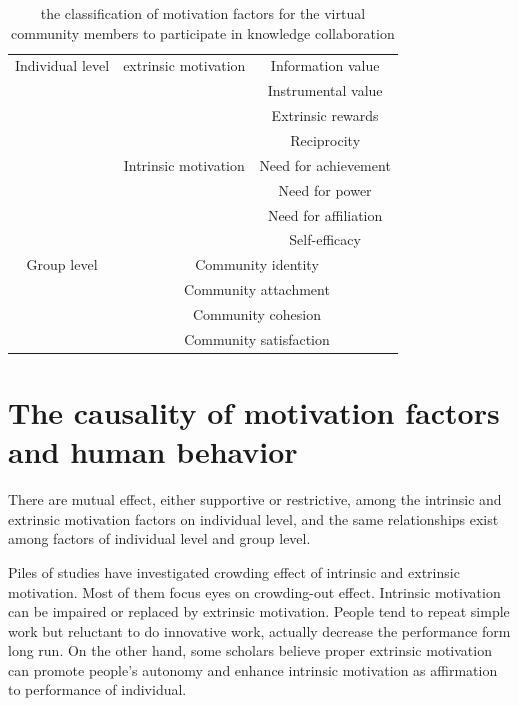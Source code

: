 \documentclass[doublespacing]{elsarticle}
\begin{document}
\begin{table}[htpb]

  \centering
   \caption{the classification of motivation factors for the virtual
    community members to participate in knowledge collaboration}
\begin{tabular}{ccc}
    \toprule
    \multicolumn{ 1}{c|}{Individual level} & \multicolumn{ 1}{|c|}{extrinsic motivation} & Information value \\
    \multicolumn{ 1}{c|}{} & \multicolumn{ 1}{|c|}{} & Instrumental value \\
    \multicolumn{ 1}{c|}{} & \multicolumn{ 1}{|c|}{} & Extrinsic rewards \\
    \multicolumn{ 1}{c|}{} & \multicolumn{ 1}{|c|}{} & Reciprocity \\\cline{2-3}
    \multicolumn{ 1}{c|}{} & \multicolumn{ 1}{|c|}{Intrinsic motivation} & Need for achievement \\
    \multicolumn{ 1}{c|}{} & \multicolumn{ 1}{|c|}{} & Need for power \\
    \multicolumn{ 1}{c|}{} & \multicolumn{ 1}{|c|}{} & Need for affiliation \\
    \multicolumn{ 1}{c|}{} & \multicolumn{ 1}{|c|}{} & Self-efficacy \\\hline
    \multicolumn{ 1}{c|}{Group level} & \multicolumn{ 2}{|c}{Community identity} \\
    \multicolumn{ 1}{c|}{} & \multicolumn{ 2}{|c}{Community attachment} \\
    \multicolumn{ 1}{c|}{} & \multicolumn{ 2}{|c}{Community cohesion} \\
    \multicolumn{ 1}{c|}{} & \multicolumn{ 2}{|c}{Community satisfaction} \\
    \bottomrule
    \end{tabular}
  \label{tab:individual-level}
\end{table}

 

\section{The causality of motivation factors and human behavior}
\label{sec:modeling-process}

There are  mutual effect, either supportive or restrictive, among the
intrinsic and extrinsic motivation factors on individual level, and the same
relationships exist among factors of  individual level and group
level. 

Piles of studies have investigated crowding effect of intrinsic and
extrinsic motivation. Most of them focus eyes on crowding-out
effect. Intrinsic motivation can be impaired or replaced by extrinsic
motivation\cite{bul-125-6-62719991101}\cite{deci2000agp}\cite{kasser2002hpm}. People
tend to repeat simple work but reluctant to do innovative work\cite{amabile1998kc}\cite{schwartz1993cad},
actually decrease the performance form long
run\cite{Kruglanski1978}. On the other hand, some scholars believe proper
extrinsic motivation can promote people's autonomy and enhance
intrinsic motivation as affirmation to  performance of individual\cite{eisenberger1999eri}\cite{eisenberger1999dpp}\cite{eisenberger1997csr}.          
\end{document}
